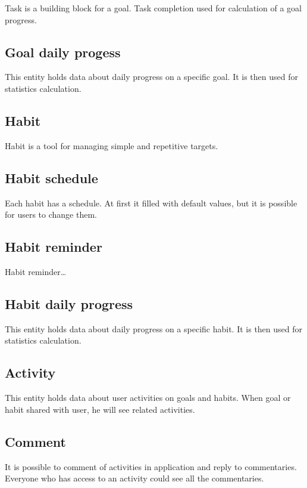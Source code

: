 Task is a building block for a goal.
Task completion used for calculation of a goal progress.

\subsection{Goal daily progess}\label{subsec:goal-daily-progess}

This entity holds data about daily progress on a specific goal.
It is then used for statistics calculation.

\subsection{Habit}\label{subsec:habit}

Habit is a tool for managing simple and repetitive targets.

\subsection{Habit schedule}\label{subsec:habit-schedule}

Each habit has a schedule.
At first it filled with default values, but it is possible for users to change them.

\subsection{Habit reminder}\label{subsec:habit-reminder}

Habit reminder\ldots

\subsection{Habit daily progress}\label{subsec:habit-daily-progress}

This entity holds data about daily progress on a specific habit.
It is then used for statistics calculation.

\subsection{Activity}\label{subsec:activity}

This entity holds data about user activities on goals and habits.
When goal or habit shared with user, he will see related activities.

\subsection{Comment}\label{subsec:comment}

It is possible to comment of activities in application and reply to commentaries.
Everyone who has access to an activity could see all the commentaries.